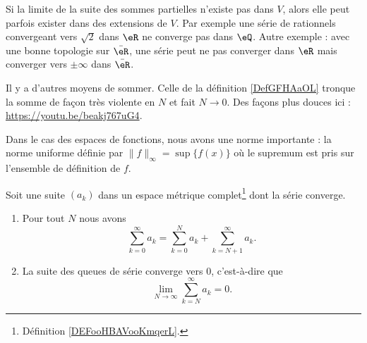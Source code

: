 \begin{remark}
	Si la limite de la suite des sommes partielles n'existe pas dans \( V\), alors elle peut parfois exister dans des extensions de \( V\). Par exemple une série de rationnels convergeant vers \( \sqrt{2}\) dans \( \eR\) ne converge pas dans \( \eQ\). Autre exemple : avec une bonne topologie sur \( \bar \eR\), une série peut ne pas converger dans \( \eR\) mais converger vers \( \pm\infty\) dans \( \bar \eR\).
\end{remark}

\begin{normaltext}
	Il y a d'autres moyens de sommer. Celle de la définition \ref{DefGFHAaOL} tronque la somme de façon très violente en \( N\) et fait \( N\to 0\). Des façons plus douces ici : \url{https://youtu.be/beakj767uG4}.
\end{normaltext}

Dans le cas des espaces de fonctions, nous avons une norme importante : la norme uniforme définie par \( \| f \|_{\infty}=\sup\{ f(x) \}\) où le supremum est pris sur l'ensemble de définition de \( f\).

\begin{lemma}       \label{LEMooHUZEooSyPipb}
	Soit une suite \( (a_k)\) dans un espace métrique complet\footnote{Définition \ref{DEFooHBAVooKmqerL}.} dont la série converge.

	\begin{enumerate}
		\item       \label{ITEMooPFSQooDhKFGL}
		      Pour tout \( N\) nous avons
		      \begin{equation}
			      \sum_{k=0}^{\infty}a_k=\sum_{k=0}^Na_k+\sum_{k=N+1}^{\infty}a_k.
		      \end{equation}
		\item       \label{ITEMooQNHMooUPjupB}
		      La suite des queues de série converge vers \( 0\), c'est-à-dire que
		      \begin{equation}
			      \lim_{N\to \infty} \sum_{k=N}^{\infty}a_k=0.
		      \end{equation}
	\end{enumerate}
\end{lemma}

